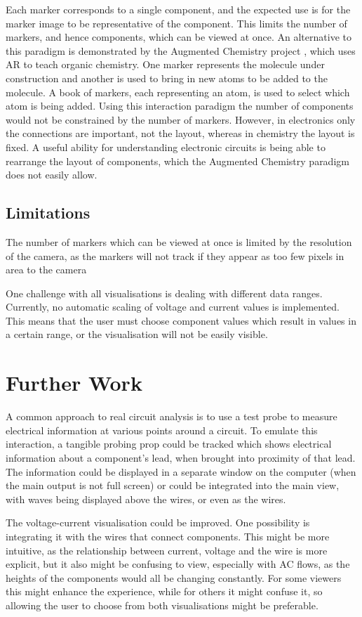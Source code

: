 Each marker corresponds to a single component, and the expected use is for the marker image to be representative of the component. This limits the number of markers, and hence components, which can be viewed at once. An alternative to this paradigm is demonstrated by the Augmented Chemistry project \cite{fjeld07}, which uses AR to teach organic chemistry. One marker represents the molecule under construction and another is used to bring in new atoms to be added to the molecule. A book of markers, each representing an atom, is used to select which atom is being added. Using this interaction paradigm the number of components would not be constrained by the number of markers. However, in electronics only the connections are important, not the layout, whereas in chemistry the layout is fixed. A useful ability for understanding electronic circuits is being able to rearrange the layout of components, which the Augmented Chemistry paradigm does not easily allow.


\subsection{Limitations}


The number of markers which can be viewed at once is limited by the resolution of the camera, as the markers will not track if they appear as too few pixels in area to the camera

One challenge with all visualisations is dealing with different data ranges. Currently, no automatic scaling of voltage and current values is implemented. This means that the user must choose component values which result in values in a certain range, or the visualisation will not be easily visible.

\section{Further Work}

A common approach to real circuit analysis is to use a test probe to measure electrical information at various points around a circuit. To emulate this interaction, a tangible probing prop could be tracked which shows electrical information about a component's lead, when brought into proximity of that lead. The information could be displayed in a separate window on the computer (when the main output is not full screen) or could be integrated into the main view, with waves being displayed above the wires, or even as the wires.

The voltage-current visualisation could be improved. One possibility is integrating it with the wires that connect components. This might be more intuitive, as the relationship between current, voltage and the wire is more explicit, but it also might be confusing to view, especially with AC flows, as the heights of the components would all be changing constantly. For some viewers this might enhance the experience, while for others it might confuse it, so allowing the user to choose from both visualisations might be preferable.

